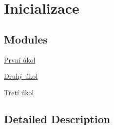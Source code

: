 \hypertarget{group__init}{\section{Inicializace}
\label{group__init}
}
\subsection*{Modules}
\begin{DoxyCompactItemize}
\item 
\hyperlink{group__task1}{První úkol}
\item 
\hyperlink{group__task2}{Druhý úkol}
\item 
\hyperlink{group__task3}{Třetí úkol}
\end{DoxyCompactItemize}


\subsection{Detailed Description}
